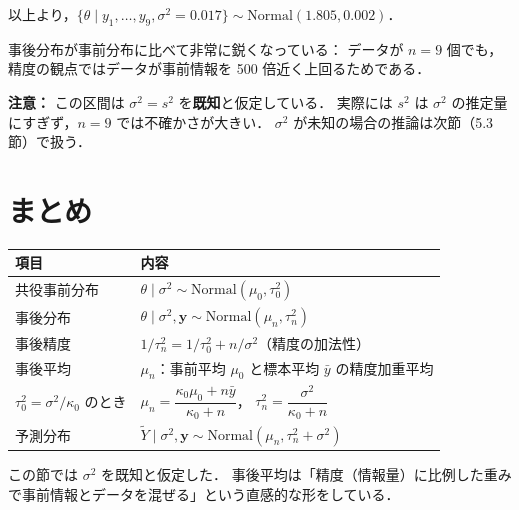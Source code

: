\documentclass[lualatex,ja=standard,a4paper,12pt]{bxjsarticle}
\begin{document}
以上より，$\{\theta \mid y_1, \ldots, y_9, \sigma^2 = 0.017\} \sim \mathrm{Normal}(1.805, 0.002)$．

\begin{center}
\end{center}

\noindent 事後分布が事前分布に比べて非常に鋭くなっている：
データが $n=9$ 個でも，精度の観点ではデータが事前情報を 500 倍近く上回るためである．

\medskip
\noindent\textbf{注意：} この区間は $\sigma^2 = s^2$ を\textbf{既知}と仮定している．
実際には $s^2$ は $\sigma^2$ の推定量にすぎず，$n=9$ では不確かさが大きい．
$\sigma^2$ が未知の場合の推論は次節（5.3節）で扱う．


\section{まとめ}

\begin{center}
\renewcommand{\arraystretch}{1.4}
\begin{tabular}{lp{9cm}}
\toprule
\textbf{項目} & \textbf{内容} \\
\midrule
共役事前分布 &
  $\theta \mid \sigma^2 \sim \mathrm{Normal}(\mu_0, \tau_0^2)$ \\
事後分布 &
  $\theta \mid \sigma^2, \mathbf{y} \sim \mathrm{Normal}(\mu_n, \tau_n^2)$ \\
事後精度 &
  $1/\tau_n^2 = 1/\tau_0^2 + n/\sigma^2$（精度の加法性） \\
事後平均 &
  $\mu_n$：事前平均 $\mu_0$ と標本平均 $\bar{y}$ の精度加重平均 \\
$\tau_0^2 = \sigma^2/\kappa_0$ のとき &
  $\mu_n = \dfrac{\kappa_0 \mu_0 + n\bar{y}}{\kappa_0 + n}$，
  $\tau_n^2 = \dfrac{\sigma^2}{\kappa_0 + n}$ \\
予測分布 &
  $\tilde{Y} \mid \sigma^2, \mathbf{y} \sim \mathrm{Normal}(\mu_n, \tau_n^2 + \sigma^2)$ \\
\bottomrule
\end{tabular}
\end{center}

\bigskip
\begin{pointbox}
この節では $\sigma^2$ を既知と仮定した．
事後平均は「精度（情報量）に比例した重みで事前情報とデータを混ぜる」という直感的な形をしている．
\end{pointbox}
\end{document}
